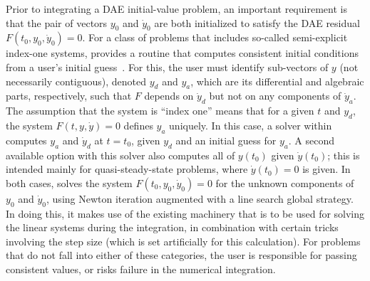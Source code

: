 Prior to integrating a DAE initial-value problem, an important requirement
is that the pair of vectors $y_0$ and $\dot{y}_0$ are both initialized to
satisfy the DAE residual $F(t_0,y_0, \dot{y}_0) = 0$.
For a class of problems that includes so-called
semi-explicit index-one systems, {\idas} provides a routine that computes
consistent initial conditions from a user's initial guess~\cite{BHP:98}.
For this, the user must identify sub-vectors of $y$
(not necessarily contiguous), denoted $y_d$ and $y_a$, which are its
differential and algebraic parts, respectively, such that $F$ depends
on $\dot{y}_d$ but not on any components of $\dot{y}_a$.  The assumption that
the system is ``index one'' means that for a given $t$ and $y_d$, the
system $F(t,y,\dot{y}) = 0$ defines $y_a$ uniquely.  In this case, a solver
within {\idas} computes $y_a$ and $\dot{y}_d$ at $t = t_0$, given $y_d$ and an
initial guess for $y_a$.  A second available option with this solver
also computes all of $y(t_0)$ given $\dot{y}(t_0)$; this is intended mainly
for quasi-steady-state problems, where $\dot{y}(t_0) = 0$ is given.
In both cases, {\ida} solves the system $F(t_0,y_0, \dot{y}_0) = 0$ for the
unknown components of $y_0$ and $\dot{y}_0$, using Newton iteration
augmented with a line search global strategy.  In doing this, it makes
use of the existing machinery that is to be used for solving the
linear systems during the integration, in combination with certain
tricks involving the step size (which is set artificially for this
calculation).
For problems that do not fall into either of these categories, the
user is responsible for passing consistent values, or risks failure in
the numerical integration.


